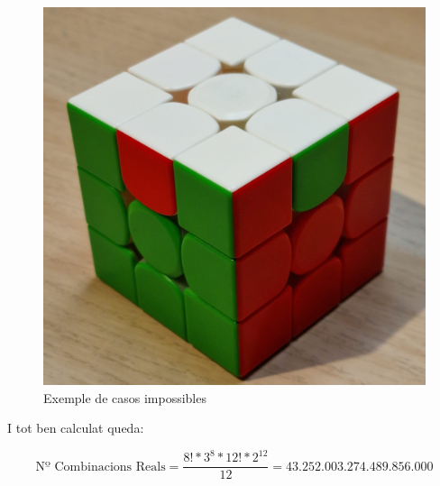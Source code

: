 \begin{figure}[ht]
\begin{minipage}[b]{0.2\textwidth}
    \end{minipage}
    \hfill
    \begin{minipage}[b]{0.2\textwidth}
        \includegraphics[width=\textwidth]{img/figures/impossible-2edge.jpg}
    \end{minipage}
    \caption{Exemple de casos impossibles}
  \end{figure}
I tot ben calculat queda:

$$ \textrm{Nº Combinacions Reals} = \frac{8!*3^8*12!*2^{12}}{12}= 43.252.003.274.489.856.000 $$

